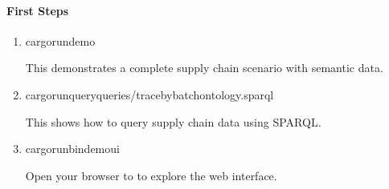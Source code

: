 \documentclass[letterpaper,10pt,english]{sphinxmanual}
\begin{document}
\paragraph{First Steps}
\label{\detokenize{user-guide/introduction:first-steps}}\begin{enumerate}
%
\item {} 
\sphinxAtStartPar
{}

\begin{sphinxVerbatim}[commandchars=\\\{\}]
cargorundemo
\end{sphinxVerbatim}

\sphinxAtStartPar
This demonstrates a complete supply chain scenario with semantic data.

\item {} 
\sphinxAtStartPar
{}

\begin{sphinxVerbatim}[commandchars=\\\{\}]
cargorun\PYGZhy{}\PYGZhy{}queryqueries/trace\PYGZus{}by\PYGZus{}batch\PYGZus{}ontology.sparql
\end{sphinxVerbatim}

\sphinxAtStartPar
This shows how to query supply chain data using SPARQL.

\item {} 
\sphinxAtStartPar
{}

\begin{sphinxVerbatim}[commandchars=\\\{\}]
cargorun\PYGZhy{}\PYGZhy{}bindemo\PYGZus{}ui
\end{sphinxVerbatim}

\sphinxAtStartPar
Open your browser to  to explore the web interface.

\end{enumerate}
\end{document}

